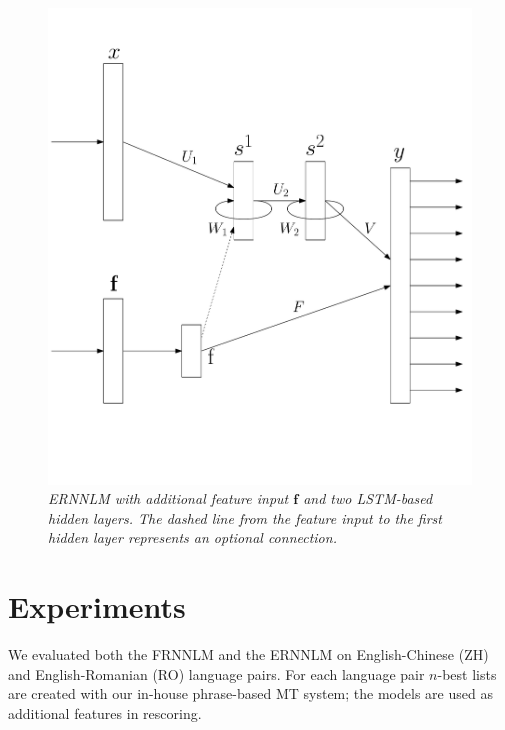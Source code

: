 \documentclass[a4paper]{article}
\begin{document}
\begin{figure} 
\centering 
\includegraphics[width=\columnwidth]{ModelExtended2.pdf}
\caption{\it ERNNLM with additional feature input $\textbf{f}$ and two LSTM-based hidden layers. The dashed line from the feature input to the first hidden layer represents an optional connection.}
\label{fig:model-extended}
\end{figure}


\section{Experiments}
We evaluated both the FRNNLM and the ERNNLM on English-Chinese (ZH) and English-Romanian (RO) language pairs. For each language pair $n$-best lists are created with our in-house phrase-based MT system; the models are used as additional features in rescoring.
\end{document}
